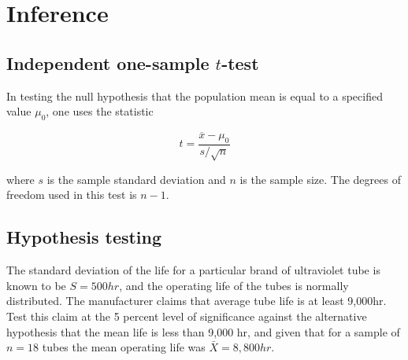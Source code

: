 \documentclass[a4paper,12pt]{article}
\begin{document}
\section{Inference}


\subsection{Independent one-sample $t$-test}
In testing the null hypothesis that the population mean is equal to a specified value $\mu_{0}$, one uses the statistic

\begin{equation}t = \frac{\overline{x} - \mu_0}{s / \sqrt{n}}\end{equation}

where $s$ is the sample standard deviation and $n$ is the sample size. The degrees of freedom used in this test is $n - 1$.



\subsection{Hypothesis testing}
The standard deviation of the life for a particular brand of
ultraviolet tube is known to be $S = 500 hr$, and the operating
life of the tubes is normally distributed. The manufacturer claims
that average tube life is at least 9,000hr. Test this claim at the
5 percent level of significance against the alternative hypothesis
that the mean life is less than 9,000 hr, and given that for a
sample of $n = 18$ tubes the mean operating life was $\bar{X}=
8,800 hr.$


\end{document}
